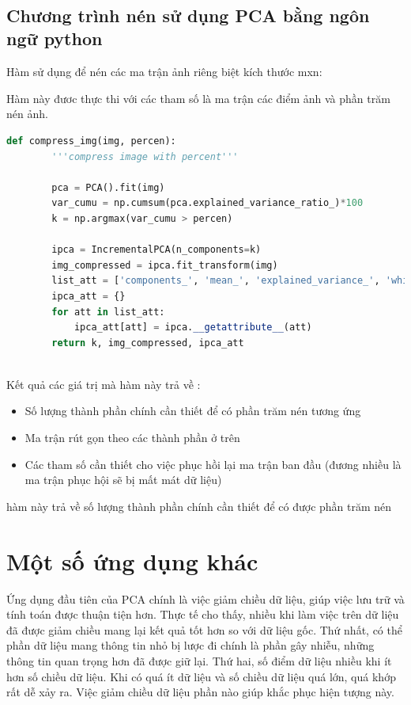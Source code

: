 \

\subsection{Chương trình nén sử dụng PCA bằng ngôn ngữ python}
Hàm sử dụng để nén các ma trận ảnh riêng biệt kích thước mxn:

Hàm này đươc thực thi với các tham số  là ma trận các điểm ảnh và phần trăm nén ảnh.

\begin{lstlisting}[language=Python]
    def compress_img(img, percen):
        '''compress image with percent'''

        pca = PCA().fit(img)
        var_cumu = np.cumsum(pca.explained_variance_ratio_)*100
        k = np.argmax(var_cumu > percen)

        ipca = IncrementalPCA(n_components=k)
        img_compressed = ipca.fit_transform(img)
        list_att = ['components_', 'mean_', 'explained_variance_', 'whiten']
        ipca_att = {}
        for att in list_att:
            ipca_att[att] = ipca.__getattribute__(att)
        return k, img_compressed, ipca_att
    
\end{lstlisting}

Kết quả các giá trị mà hàm này trả về :
\begin{itemize}
    \item Số lượng thành phần chính cần thiết để có phần trăm nén tương ứng
    \item Ma trận rút gọn theo các thành phần ở trên
    \item Các tham số cần thiết cho việc phục hồi lại ma trận ban đầu (đương nhiều là ma trận phục hội sẽ bị mất mát dữ liệu)
\end{itemize}




hàm này trả về số lượng thành phần chính cần thiết để có được phần trăm nén
\section{Một số ứng dụng khác}
Ứng dụng đầu tiên của PCA chính là việc giảm chiều dữ liệu, giúp
việc lưu trữ và tính toán được thuận tiện hơn. Thực tế cho thấy, nhiều khi làm
việc trên dữ liệu đã được giảm chiều mang lại kết quả tốt hơn so với dữ liệu
gốc. Thứ nhất, có thể phần dữ liệu mang thông tin nhỏ bị lược đi chính là phần
gây nhiễu, những thông tin quan trọng hơn đã được giữ lại. Thứ hai, số điểm dữ
liệu nhiều khi ít hơn số chiều dữ liệu. Khi có quá ít dữ liệu và số chiều dữ
liệu quá lớn, quá khớp rất dễ xảy ra. Việc giảm chiều dữ liệu phần nào giúp
khắc phục hiện tượng này.

